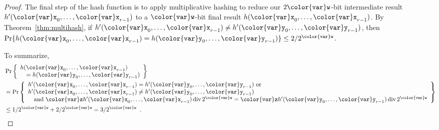 \documentclass[10pt]{book}
\theoremstyle{plain}
\newcommand{\thmref}[1]{Theorem~\ref{thm:#1}}
\theoremstyle{definition}
\DeclareMathOperator{\ddiv}{div}
\begin{document}
\begin{proof}
  The final step of the hash function is to apply multiplicative hashing
  to reduce our $2\ensuremath{\mathtt{{\color{var}w}}}$-bit intermediate result $h'(\ensuremath{\mathtt{{\color{var}x}}}_0,\ldots,\ensuremath{\mathtt{{\color{var}x}}}_{r-1})$ to
  a \ensuremath{\mathtt{{\color{var}w}}}-bit final result $h(\ensuremath{\mathtt{{\color{var}x}}}_0,\ldots,\ensuremath{\mathtt{{\color{var}x}}}_{r-1})$.  By \thmref{multihash},
  if $h'(\ensuremath{\mathtt{{\color{var}x}}}_0,\ldots,\ensuremath{\mathtt{{\color{var}x}}}_{r-1})\neq h'(\ensuremath{\mathtt{{\color{var}y}}}_0,\ldots,\ensuremath{\mathtt{{\color{var}y}}}_{r-1})$, then
  $\Pr\{h(\ensuremath{\mathtt{{\color{var}x}}}_0,\ldots,\ensuremath{\mathtt{{\color{var}x}}}_{r-1}) = h(\ensuremath{\mathtt{{\color{var}y}}}_0,\ldots,\ensuremath{\mathtt{{\color{var}y}}}_{r-1})\} \le 2/2^{\ensuremath{\mathtt{{\color{var}w}}}}$.

  To summarize, 
  \begin{align*}
    & \Pr\left\{\begin{array}{l}
          h(\ensuremath{\mathtt{{\color{var}x}}}_0,\ldots,\ensuremath{\mathtt{{\color{var}x}}}_{r-1}) \\
          \quad = h(\ensuremath{\mathtt{{\color{var}y}}}_0,\ldots,\ensuremath{\mathtt{{\color{var}y}}}_{r-1})\end{array}\right\} \\
      &= \Pr\left\{\begin{array}{ll}
            \mbox{$h'(\ensuremath{\mathtt{{\color{var}x}}}_0,\ldots,\ensuremath{\mathtt{{\color{var}x}}}_{r-1}) = h'(\ensuremath{\mathtt{{\color{var}y}}}_0,\ldots,\ensuremath{\mathtt{{\color{var}y}}}_{r-1})$ or} \\
            \mbox{$h'(\ensuremath{\mathtt{{\color{var}x}}}_0,\ldots,\ensuremath{\mathtt{{\color{var}x}}}_{r-1}) \neq h'(\ensuremath{\mathtt{{\color{var}y}}}_0,\ldots,\ensuremath{\mathtt{{\color{var}y}}}_{r-1})$} \\
                 \quad  \mbox{and
$\ensuremath{\mathtt{{\color{var}z}}}h'(\ensuremath{\mathtt{{\color{var}x}}}_0,\ldots,\ensuremath{\mathtt{{\color{var}x}}}_{r-1})\ddiv2^{\ensuremath{\mathtt{{\color{var}w}}}} = \ensuremath{\mathtt{{\color{var}z}}} h'(\ensuremath{\mathtt{{\color{var}y}}}_0,\ldots,\ensuremath{\mathtt{{\color{var}y}}}_{r-1})\ddiv 2^{\ensuremath{\mathtt{{\color{var}w}}}}$}
          \end{array}\right\} \\
      &\le 1/2^{\ensuremath{\mathtt{{\color{var}w}}}} + 2/2^{\ensuremath{\mathtt{{\color{var}w}}}} = 3/2^{\ensuremath{\mathtt{{\color{var}w}}}} \enspace . \qedhere
  \end{align*}
\end{proof}
\end{document}

